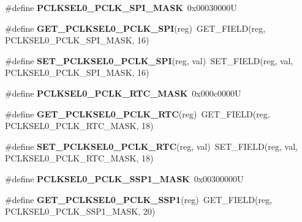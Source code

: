 \begin{DoxyCompactItemize}
\mbox{\label{group__lpc24xx__regs_gabd265fd700a9cf78adebe9d2fd2a401d}} 
\#define {\bfseries P\+C\+L\+K\+S\+E\+L0\+\_\+\+P\+C\+L\+K\+\_\+\+S\+P\+I\+\_\+\+M\+A\+SK}~0x00030000U
\item 
\mbox{\label{group__lpc24xx__regs_ga5be0a5a9ed1c251c63d9b7895cdd6101}} 
\#define {\bfseries G\+E\+T\+\_\+\+P\+C\+L\+K\+S\+E\+L0\+\_\+\+P\+C\+L\+K\+\_\+\+S\+PI}(reg)~G\+E\+T\+\_\+\+F\+I\+E\+LD(reg, P\+C\+L\+K\+S\+E\+L0\+\_\+\+P\+C\+L\+K\+\_\+\+S\+P\+I\+\_\+\+M\+A\+SK, 16)
\item 
\mbox{\label{group__lpc24xx__regs_gae4e10b476483b7676d4ec642d7208ad3}} 
\#define {\bfseries S\+E\+T\+\_\+\+P\+C\+L\+K\+S\+E\+L0\+\_\+\+P\+C\+L\+K\+\_\+\+S\+PI}(reg,  val)~S\+E\+T\+\_\+\+F\+I\+E\+LD(reg, val, P\+C\+L\+K\+S\+E\+L0\+\_\+\+P\+C\+L\+K\+\_\+\+S\+P\+I\+\_\+\+M\+A\+SK, 16)
\item 
\mbox{\label{group__lpc24xx__regs_ga16e391b38beb8a6af26e8ffe091be50a}} 
\#define {\bfseries P\+C\+L\+K\+S\+E\+L0\+\_\+\+P\+C\+L\+K\+\_\+\+R\+T\+C\+\_\+\+M\+A\+SK}~0x000c0000U
\item 
\mbox{\label{group__lpc24xx__regs_ga944846694031fec426b287b53deab323}} 
\#define {\bfseries G\+E\+T\+\_\+\+P\+C\+L\+K\+S\+E\+L0\+\_\+\+P\+C\+L\+K\+\_\+\+R\+TC}(reg)~G\+E\+T\+\_\+\+F\+I\+E\+LD(reg, P\+C\+L\+K\+S\+E\+L0\+\_\+\+P\+C\+L\+K\+\_\+\+R\+T\+C\+\_\+\+M\+A\+SK, 18)
\item 
\mbox{\label{group__lpc24xx__regs_gaaf4aefbba62c7a9472531f33d9647c10}} 
\#define {\bfseries S\+E\+T\+\_\+\+P\+C\+L\+K\+S\+E\+L0\+\_\+\+P\+C\+L\+K\+\_\+\+R\+TC}(reg,  val)~S\+E\+T\+\_\+\+F\+I\+E\+LD(reg, val, P\+C\+L\+K\+S\+E\+L0\+\_\+\+P\+C\+L\+K\+\_\+\+R\+T\+C\+\_\+\+M\+A\+SK, 18)
\item 
\mbox{\label{group__lpc24xx__regs_ga720b75e818c8a15d3de744f479348647}} 
\#define {\bfseries P\+C\+L\+K\+S\+E\+L0\+\_\+\+P\+C\+L\+K\+\_\+\+S\+S\+P1\+\_\+\+M\+A\+SK}~0x00300000U
\item 
\mbox{\label{group__lpc24xx__regs_ga0228bfd85513a8e43a179eb52d00698a}} 
\#define {\bfseries G\+E\+T\+\_\+\+P\+C\+L\+K\+S\+E\+L0\+\_\+\+P\+C\+L\+K\+\_\+\+S\+S\+P1}(reg)~G\+E\+T\+\_\+\+F\+I\+E\+LD(reg, P\+C\+L\+K\+S\+E\+L0\+\_\+\+P\+C\+L\+K\+\_\+\+S\+S\+P1\+\_\+\+M\+A\+SK, 20)

\end{DoxyCompactItemize}
